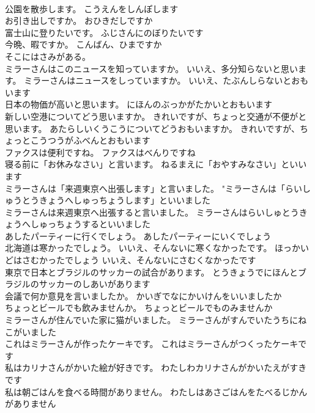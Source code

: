 \documentclass[8pt]{extreport}
\begin{document}
\begin{CJK}{UTF8}{min}
\\	公園を散歩します。	こうえんをしんぽします 
\\	お引き出しですか。	おひきだしですか 
\\	富士山に登りたいです。	ふじさんにのぼりたいです 
\\	今晩、暇ですか。	こんばん、ひまですか 
\\	そこにはさみがある。	
\\	ミラーさんはこのニュースを知っていますか。 いいえ、多分知らないと思います。	ミラーさんはニュースをしっていますか。 いいえ、たぶんしらないとおもいます 
\\	日本の物価が高いと思います。	にほんのぶっかがたかいとおもいます 
\\	新しい空港についてどう思いますか。 きれいですが、ちょっと交通が不便がと思います。	あたらしいくうこうについてどうおもいますか。 きれいですが、ちょっとこうつうがふべんとおもいます 
\\	ファクスは便利ですね。	ファクスはべんりですね 
\\	寝る前に「お休みなさい」と言います。	ねるまえに「おやすみなさい」といいます 
\\	ミラーさんは「来週東京へ出張します」と言いました。	"ミラーさんは「らいしゅうとうきょうへしゅっちょうします」といいました 
\\	ミラーさんは来週東京へ出張すると言いました。	ミラーさんはらいしゅとうきょうへしゅっちょうするといいました 
\\	あしたパーティーに行くでしょう。	あしたパーティーにいくでしょう 
\\	北海道は寒かったでしょう。 いいえ、そんないに寒くなかったです。	ほっかいどはさむかったでしょう いいえ、そんないにさむくなかったです 
\\	東京で日本とブラジルのサッカーの試合があります。	とうきょうでにほんとブラジルのサッカーのしあいがあります 
\\	会議で何か意見を言いましたか。	かいぎでなにかいけんをいいましたか 
\\	ちょっとビールでも飲みませんか。	ちょっとビールでものみませんか 
\\	ミラーさんが住んでいた家に猫がいました。	ミラーさんがすんでいたうちにねこがいました 
\\	これはミラーさんが作ったケーキです。	これはミラーさんがつくったケーキです 
\\	私はカリナさんがかいた絵が好きです。	わたしわカリナさんがかいたえがすきです 
\\	私は朝ごはんを食べる時間がありません。	わたしはあさごはんをたべるじかんがありません 

\end{CJK}
\end{document}
